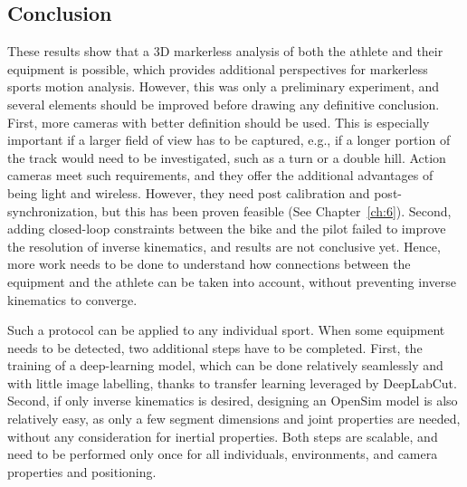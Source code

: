 \subsection{Conclusion}
These results show that a 3D markerless analysis of both the athlete and their equipment is possible, which provides additional perspectives for markerless sports motion analysis. However, this was only a preliminary experiment, and several elements should be improved before drawing any definitive conclusion. First, more cameras with better definition should be used. This is especially important if a larger field of view has to be captured, e.g., if a longer portion of the track would need to be investigated, such as a turn or a double hill. Action cameras meet such requirements, and they offer the additional advantages of being light and wireless. However, they need post calibration and post-synchronization, but this has been proven feasible (See Chapter~\ref{ch:6}). Second, adding closed-loop constraints between the bike and the pilot failed to improve the resolution of inverse kinematics, and results are not conclusive yet. Hence, more work needs to be done to understand how connections between the equipment and the athlete can be taken into account, without preventing inverse kinematics to converge.

Such a protocol can be applied to any individual sport. When some equipment needs to be detected, two additional steps have to be completed. First, the training of a deep-learning model, which can be done relatively seamlessly and with little image labelling, thanks to transfer learning leveraged by DeepLabCut. Second, if only inverse kinematics is desired, designing an OpenSim model is also relatively easy, as only a few segment dimensions and joint properties are needed, without any consideration for inertial properties. Both steps are scalable, and need to be performed only once for all individuals, environments, and camera properties and positioning. 











